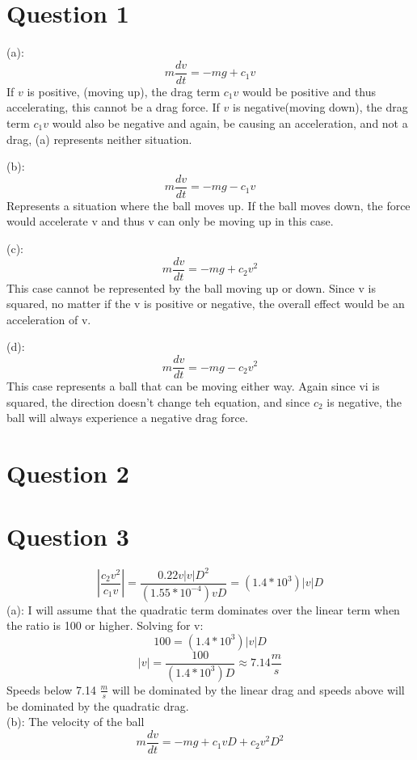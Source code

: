 \documentclass[a4paper,12pt]{article}
\begin{document}
\section*{Question 1}


(a): \[m\frac{dv}{dt}=-mg+c_1v\] 
If $v$ is positive, (moving up), the drag term $c_1v$ would be positive and thus accelerating, this cannot be a drag force.  If $v$ is negative(moving down), the drag term $c_1v$ would also be negative and again, be causing an acceleration, and not a drag, (a) represents neither situation.

(b):\[m\frac{dv}{dt}=-mg-c_1v\] Represents a situation where the ball
moves up.  If the ball moves down, the force would accelerate v and
thus v can only be moving up in this case.

(c):\[m\frac{dv}{dt}=-mg+c_2v^2\] This case cannot be represented by
the ball moving up or down.  Since v is squared, no matter if the v is
positive or negative, the overall effect would be an acceleration of
v.

(d):\[m\frac{dv}{dt}=-mg-c_2v^2\] This case represents a ball that can
be moving either way.  Again since vi is squared, the direction
doesn't change teh equation, and since $c_2$ is negative, the ball
will always experience a negative drag force.

\section*{Question 2}

\section*{Question 3}
\[\left|\frac{c_2v^2}{c_1v}\right|=\frac{0.22v\left|v\right|D^2}{(1.55\ast10^{-4})vD}=(1.4\ast10^3)\left|v\right|D\](a):
I
will assume that the quadratic term dominates over the linear term
when the ratio is 100 or higher.  Solving for v:
\[100=(1.4\ast10^3)\left|v\right|D\]
\[\left|v\right|=\frac{100}{(1.4\ast10^3)D}\approx7.14\frac{m}{s}\]
Speeds below 7.14 $\frac{m}{s}$ will be dominated by the linear drag
and speeds above will be dominated by the quadratic drag.\\
(b): The velocity of the ball \[m\frac{dv}{dt}=-mg+c_1vD+c_2v^2D^2\]
\end{document}
